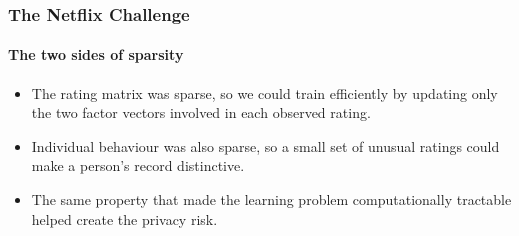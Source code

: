 \documentclass[]{article}
\begin{document}
\begin{frame}
\frametitle{The Netflix Challenge}
\framesubtitle{The two sides of sparsity}
\begin{itemize}
	\item The rating matrix was sparse, so we could train efficiently by updating only the two factor vectors involved in each observed rating.
	\item Individual behaviour was also sparse, so a small set of unusual ratings could make a person's record distinctive.
	\item The same property that made the learning problem computationally tractable helped create the privacy risk.
\end{itemize}
\end{frame}
\end{document}
